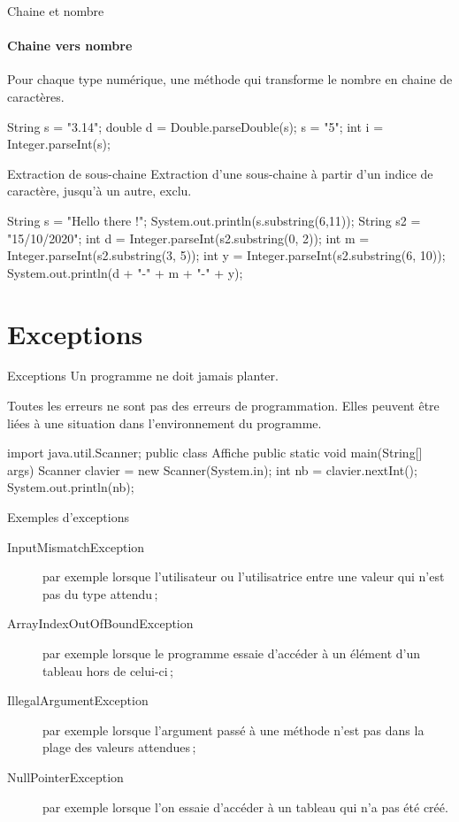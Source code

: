 \begin{hideedit}
\begin{frame}[fragile]{Chaine et nombre}
  \framesubtitle{Chaine vers nombre}
  Pour chaque type numérique, une méthode qui transforme le nombre en chaine de
  caractères.
  \begin{java}
String s = "3.14";
double d = Double.parseDouble(s);
s = "5";
int i = Integer.parseInt(s);
  \end{java}
\end{frame}

\begin{frame}[fragile]{Extraction de sous-chaine}
  Extraction d'une sous-chaine à partir d'un indice de caractère, jusqu'à un
  autre, exclu.
  \begin{java}
String s = "Hello there !";
System.out.println(s.substring(6,11));
String s2 = "15/10/2020";
int d = Integer.parseInt(s2.substring(0, 2));
int m = Integer.parseInt(s2.substring(3, 5));
int y = Integer.parseInt(s2.substring(6, 10));
System.out.println(d + "-" + m + "-" + y);
  \end{java}
\end{frame}

\section{Exceptions}
\frame{\sectionpage}

\begin{frame}[fragile]{Exceptions}
  Un programme ne doit jamais planter.

  \pause
  Toutes les erreurs ne sont pas des erreurs de programmation. Elles peuvent
  être liées à une situation  dans l'environnement
  du programme.

\begin{java}
import java.util.Scanner;
public class Affiche {
    public static void main(String[] args) {
        Scanner clavier = new Scanner(System.in);
        int nb = clavier.nextInt();
        System.out.println(nb);
    }
}
\end{java}
\end{frame}

\begin{frame}{Exemples d'exceptions}
\begin{description}
  \item[InputMismatchException] par exemple lorsque l'utilisateur ou
    l'utilisatrice entre une valeur qui n'est pas du type attendu\,;
  \item[ArrayIndexOutOfBoundException] par exemple lorsque le programme
    essaie d'accéder à un élément d'un tableau hors de celui-ci\,;
  \item[IllegalArgumentException] par exemple lorsque l'argument passé à
    une méthode n'est pas dans la plage des valeurs attendues\,;
  \item[NullPointerException] par exemple lorsque l'on essaie d'accéder à
    un tableau qui n'a pas été créé.
\end{description}
\end{frame}


\end{hideedit}
